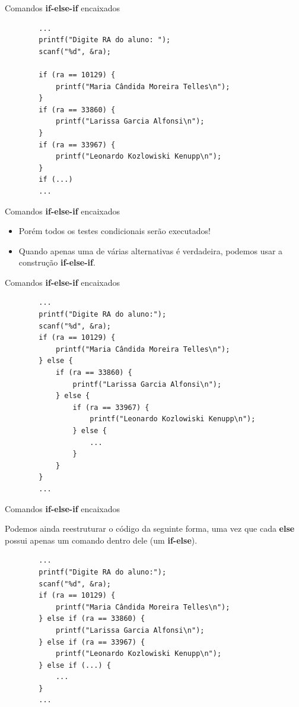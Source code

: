 \documentclass[handout]{beamer}
\begin{document}
\begin{frame}[fragile]{Comandos {\bf if-else-if} encaixados}
    \begin{verbatim}
        ...
        printf("Digite RA do aluno: ");
        scanf("%d", &ra);

        if (ra == 10129) {
            printf("Maria Cândida Moreira Telles\n");
        }
        if (ra == 33860) {
            printf("Larissa Garcia Alfonsi\n");
        }
        if (ra == 33967) {
            printf("Leonardo Kozlowiski Kenupp\n");
        }
        if (...)
        ...
    \end{verbatim}
\end{frame}

\begin{frame}[fragile]{Comandos {\bf if-else-if} encaixados}

    \begin{itemize}[<+->]
        \item Porém todos os testes condicionais serão executados!
        \item Quando apenas uma de várias alternativas é verdadeira, podemos usar a construção {\bf if-else-if}.
    \end{itemize}
\end{frame}

\begin{frame}[fragile]{Comandos {\bf if-else-if} encaixados}
    \begin{verbatim}
        ...
        printf("Digite RA do aluno:");
        scanf("%d", &ra);
        if (ra == 10129) {
            printf("Maria Cândida Moreira Telles\n");
        } else {
            if (ra == 33860) {
                printf("Larissa Garcia Alfonsi\n");
            } else {
                if (ra == 33967) {
                    printf("Leonardo Kozlowiski Kenupp\n");
                } else {
                    ...
                }
            }
        }
        ...
    \end{verbatim}
\end{frame}

\begin{frame}[fragile]{Comandos {\bf if-else-if} encaixados}

    Podemos ainda reestruturar o código da seguinte forma, uma vez que cada \textbf{else} possui apenas um comando dentro dele (um \textbf{if-else}).

    \begin{verbatim}
        ...
        printf("Digite RA do aluno:");
        scanf("%d", &ra);
        if (ra == 10129) {
            printf("Maria Cândida Moreira Telles\n");
        } else if (ra == 33860) {
            printf("Larissa Garcia Alfonsi\n");
        } else if (ra == 33967) {
            printf("Leonardo Kozlowiski Kenupp\n");
        } else if (...) {
            ...
        }
        ...
    \end{verbatim}
\end{frame}
\end{document}
